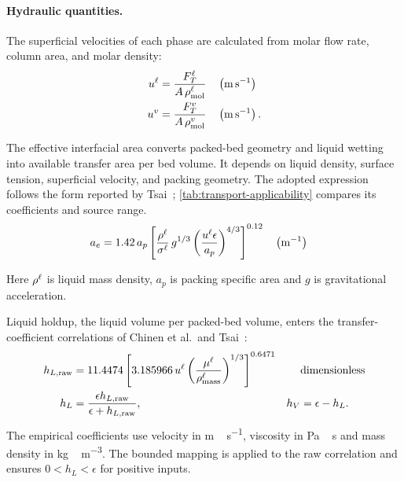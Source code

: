 \paragraph{Hydraulic quantities.}
The superficial velocities of each phase are calculated from molar flow rate, column area, and molar density:
\begin{align}
u^{\liq} &= \frac{\molarflow^{\liq}_{T}}{A \,\rho^{\liq}_{ \text{mol}}}
&& \left(\unit{m\,s^{-1}}\right)\\
u^{\vap} &= \frac{\molarflow^{\vap}_{T}}{A \,\rho^{\vap}_{ \text{mol}}}
&& \left(\unit{m\,s^{-1}}\right).
\end{align}


The effective interfacial area converts packed-bed geometry and liquid wetting into available transfer area per bed volume.
It depends on liquid density, surface tension, superficial velocity, and packing geometry.
The adopted expression follows the form reported by Tsai~\cite{Tsai2010}; \cref{tab:transport-applicability} compares its coefficients and source range.
\begin{align}
a_e
&= 1.42\,a_p\left[\frac{\rho^{\liq}}{\sigma^{\liq}}\,g^{1/3}\left(\frac{u^{\liq}\epsilon}{a_p}\right)^{4/3}\right]^{0.12} && \left(\unit{m^{-1}}\right)
\end{align}

Here \(\rho^{\ell}\) is liquid mass density, \(a_p\) is packing specific area and \(g\) is gravitational acceleration.


Liquid holdup, the liquid volume per packed-bed volume, enters the transfer-coefficient correlations of Chinen et al.\ and Tsai~\cite{Chinen2018,Tsai2010}:
\begin{align}
h_{L,\mathrm{raw}} &= 11.4474\left[3.185966\,u^{\ell}\left(\frac{\mu^{\ell}}{\rho_{\mathrm{mass}}^{\ell}}\right)^{1/3}\right]^{0.6471}
&& \text{dimensionless}\\
h_L &= \frac{\epsilon h_{L,\mathrm{raw}}}{\epsilon+h_{L,\mathrm{raw}}},&
h_V &= \epsilon-h_L.
\end{align}
The empirical coefficients use velocity in \unit{m\,s^{-1}}, viscosity in \unit{Pa\,s} and mass density in \unit{kg\,m^{-3}}.
The bounded mapping is applied to the raw correlation and ensures \(0<h_L<\epsilon\) for positive inputs.

